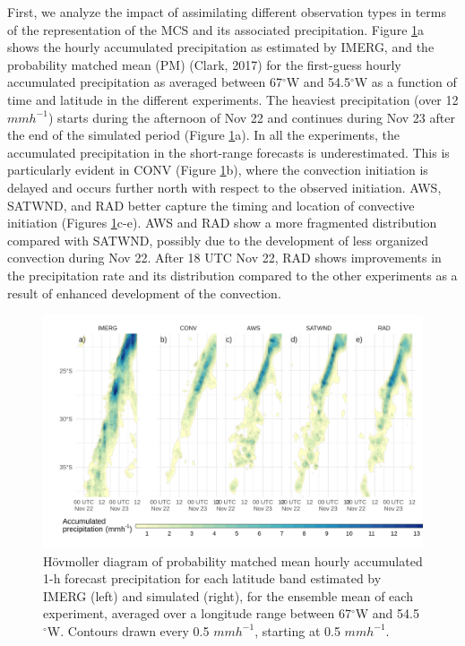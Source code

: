 \documentclass[final,5p,times,twocolumn,authoryear]{elsarticle} %
\begin{document}
First, we analyze the impact of assimilating different observation types in terms of the representation of the MCS and its associated precipitation. Figure \ref{fig:pp-hov}a shows the hourly accumulated precipitation as estimated by IMERG, and the probability matched mean (PM) (Clark, 2017) for the first-guess hourly accumulated precipitation as averaged between 67\(^{\circ}\)W and 54.5\(^{\circ}\)W as a function of time and latitude in the different experiments. The heaviest precipitation (over 12 \(mmh^{-1}\)) starts during the afternoon of Nov 22 and continues during Nov 23 after the end of the simulated period (Figure \ref{fig:pp-hov}a). In all the experiments, the accumulated precipitation in the short-range forecasts is underestimated. This is particularly evident in CONV (Figure \ref{fig:pp-hov}b), where the convection initiation is delayed and occurs further north with respect to the observed initiation. AWS, SATWND, and RAD better capture the timing and location of convective initiation (Figures \ref{fig:pp-hov}c-e). AWS and RAD show a more fragmented distribution compared with SATWND, possibly due to the development of less organized convection during Nov 22. After 18 UTC Nov 22, RAD shows improvements in the precipitation rate and its distribution compared to the other experiments as a result of enhanced development of the convection.



\begin{figure}[h]
\includegraphics{../figures/pp-hov-1} \caption{Hövmoller diagram of probability matched mean hourly accumulated 1-h forecast precipitation for each latitude band estimated by IMERG (left) and simulated (right), for the ensemble mean of each experiment, averaged over a longitude range between 67\(^{\circ}\)W and 54.5\(^{\circ}\)W. Contours drawn every 0.5 \(mmh^{-1}\), starting at 0.5 \(mmh^{-1}\).}\label{fig:pp-hov}
\end{figure}
\end{document}
